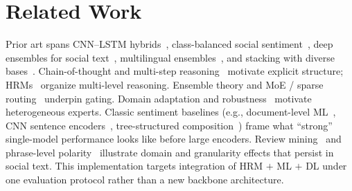 \section{Related Work}
\label{sec:related}

Prior art spans CNN--LSTM hybrids~\cite{ref12}, class-balanced social sentiment~\cite{ref14}, deep ensembles for social text~\cite{ref15}, multilingual ensembles~\cite{ref13}, and stacking with diverse bases~\cite{ref16,ref17}. Chain-of-thought and multi-step reasoning~\cite{ref09,ref18,ref19,ref20,ref21} motivate explicit structure; HRMs~\cite{ref08} organize multi-level reasoning. Ensemble theory and MoE / sparse routing~\cite{ref22,ref23,ref24,ref25,ref26,ref27,ref28,ref29} underpin gating. Domain adaptation and robustness~\cite{ref05,ref06,ref30} motivate heterogeneous experts. Classic sentiment baselines (e.g., document-level ML~\cite{ref33}, CNN sentence encoders~\cite{ref35}, tree-structured composition~\cite{ref34}) frame what ``strong'' single-model performance looks like before large encoders. Review mining~\cite{ref31} and phrase-level polarity~\cite{ref32} illustrate domain and granularity effects that persist in social text. This implementation targets integration of HRM $+$ ML $+$ DL under one evaluation protocol rather than a new backbone architecture.

